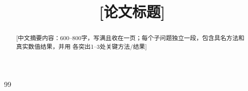 \documentclass[a4paper]{yrdmcm}
\title{[论文标题]}
\date{}
\begin{document}
\begin{abstract}

[中文摘要内容：600--800字，写满且收在一页；每个子问题独立一段，包含具名方法和真实数值结果，并用 \textbf{} 各突出1--3处关键方法/结果]

\begin{keywords}
[关键词1] \quad [关键词2] \quad [关键词3]
\end{keywords}
\end{abstract}

\maketitle
\newpage
\clearpage










\begin{thebibliography}{99}
\end{thebibliography}

\begin{appendices}

\end{appendices}
\end{document}
